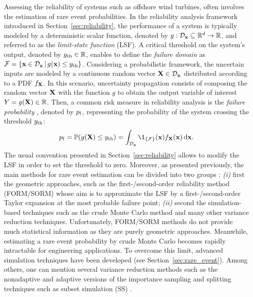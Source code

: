 Assessing the reliability of systems such as offshore wind turbines, often involves the estimation of rare event probabilities. 
In the reliability analysis framework introduced in Section~\ref{sec:reliability}, the performance of a system is typically modeled by a deterministic scalar function, denoted by $g: \mathcal{D}_{\bf x} \subseteq \mathbb{R}^d \rightarrow \mathbb{R}$, and referred to as the \textit{limit-state function} (LSF). 
A critical threshold on the system's output, denoted by $y_\mathrm{th} \in \mathbb{R}$, enables to define the \textit{failure domain} as $\mathcal{F} = \{{\bf x} \in \mathcal{D}_{\bf x} \, | \,  g({\bf x}) \leq y_\mathrm{th}\}$. 
Considering a probabilistic framework, the uncertain inputs are modeled by a continuous random vector ${\bf X} \in \mathcal{D}_{\bf x}$ distributed according to a PDF $f_{\bf X}$. 
In this scenario, uncertainty propagation consists of composing the random vector ${\bf X}$ with the function $g$ to obtain the output variable of interest $Y = g({\bf X}) \in \mathbb{R}$. 
Then, a common risk measure in reliability analysis is the \textit{failure probability} \citep{rockafellar_2015}, denoted by $p_\mathrm{f}$, representing the probability of the system crossing the threshold $y_\mathrm{th}$:
\begin{equation}
    \label{eq:failure_proba_c6}
    \pf = \P(g(\bX) \leq \yth)
        = \int_{\iD_\bx} \1_{\{\iF\}}(\bx) f_\bX(\bx) \, \dd\bx.
\end{equation}
The usual convention presented in Section~\ref{sec:reliability} allows to modify the LSF in order to set the threshold to zero. 
Moreover, as presented previously, the main methods for rare event estimation can be divided into two groups \citep{MorioBalesdent2015}: 
\textit{(i)} first the geometric approaches, such as the first-/second-order reliability method (FORM/SORM) whose aim is to approximate the LSF by a first-/second-order Taylor expansion at the most probable failure point; 
\textit{(ii)} second the simulation-based techniques such as the crude Monte Carlo method and many other variance reduction techniques. 
Unfortunately, FORM/SORM methods do not provide much statistical information as they are purely geometric approaches. 
Meanwhile, estimating a rare event probability by crude Monte Carlo becomes rapidly intractable for engineering applications. 
To overcome this limit, advanced simulation techniques have been developed (see Section~\ref{sec:rare_event}). 
Among others, one can mention several variance reduction methods such as the nonadaptive and adaptive versions of the importance sampling \citep{RubinsteinKroese1981} and splitting techniques \citep{cerou2012sequential} such as subset simulation (SS) \citep{AuBeck2001}.

